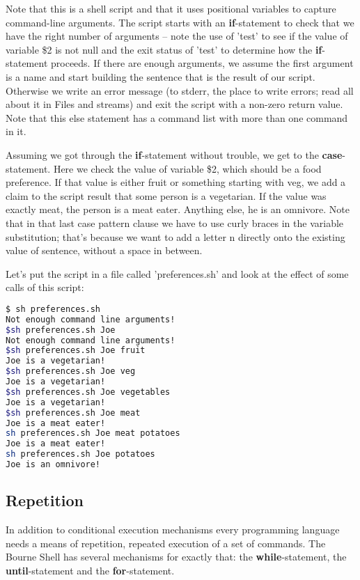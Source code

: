 Note that this is a shell script and that it uses positional variables to
capture command-line arguments. The script starts with an \textbf{if}-statement
to check that we have the right number of arguments -- note the use of 'test'
to see if the value of variable \$2 is not null and the exit status of 'test'
to determine how the \textbf{if}-statement proceeds. If there are enough
arguments, we assume the first argument is a name and start building the
sentence that is the result of our script. Otherwise we write an error message
(to stderr, the place to write errors; read all about it in Files and streams)
and exit the script with a non-zero return value. Note that this else statement
has a command list with more than one command in it.

Assuming we got through the \textbf{if}-statement without trouble, we get to
the \textbf{case}-statement. Here we check the value of variable \$2, which
should be a food preference. If that value is either fruit or something
starting with veg, we add a claim to the script result that some person is a
vegetarian. If the value was exactly meat, the person is a meat eater. Anything
else, he is an omnivore. Note that in that last case pattern clause we have to
use curly braces in the variable substitution; that's because we want to add a
letter n directly onto the existing value of sentence, without a space in
between.

Let's put the script in a file called 'preferences.sh' and look at the effect
of some calls of this script:

\lstset{basicstyle=\scriptsize, numbers=left, captionpos=b, tabsize=4}
\begin{lstlisting}[caption=Calling the script with different effects,language={bash},
breaklines=true,xleftmargin=15pt,label=lst:Calling the script with different effects]
$ sh preferences.sh
Not enough command line arguments!
$sh preferences.sh Joe
Not enough command line arguments!
$sh preferences.sh Joe fruit
Joe is a vegetarian!
$sh preferences.sh Joe veg
Joe is a vegetarian!
$sh preferences.sh Joe vegetables
Joe is a vegetarian!
$sh preferences.sh Joe meat
Joe is a meat eater!
sh preferences.sh Joe meat potatoes
Joe is a meat eater!
sh preferences.sh Joe potatoes
Joe is an omnivore!
\end{lstlisting}

\subsection{Repetition}
In addition to conditional execution mechanisms every programming language
needs a means of repetition, repeated execution of a set of commands. The
Bourne Shell has several mechanisms for exactly that: the
\textbf{while}-statement, the \textbf{until}-statement and the
\textbf{for}-statement.

